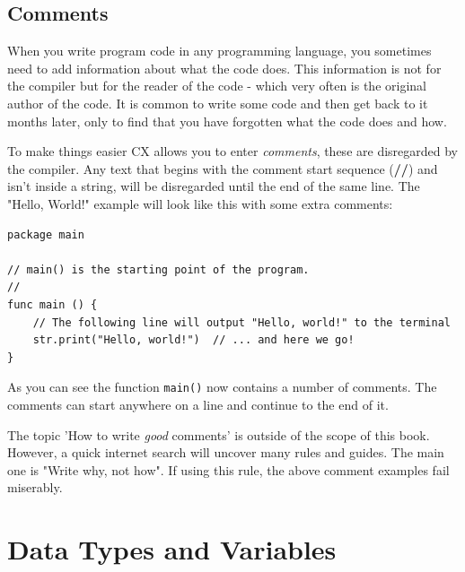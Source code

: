 \documentclass[11pt,fleqn,openany]{book} %
\begin{document}
\section{Comments}

When you write program code in any programming language, you sometimes need to add information about what the code does. This information is not for the compiler but for the reader of the code - which very often is the original author of the code. It is common to write some code and then get back to it months later, only to find that you have forgotten what the code does and how.

To make things easier CX allows you to enter \emph{comments}, these are disregarded by the compiler. Any text that begins with the comment start sequence (\textbf{//}) and isn't inside a string, will be disregarded until the end of the same line. The "Hello, World!" example will look like this with some extra comments:

\begin{lstlisting}[caption={Commented "Hello, world!" example},captionpos=b,label={listing:hello-world-commented}]
package main

// main() is the starting point of the program.
//
func main () {
    // The following line will output "Hello, world!" to the terminal
 	str.print("Hello, world!")  // ... and here we go!
}
\end{lstlisting}

As you can see the function \texttt{main()} now contains a number of comments. The comments can start anywhere on a line and continue to the end of it.

The topic 'How to write \emph{good} comments' is outside of the scope of this book. However, a quick internet search will uncover many rules and guides.  The main one is "Write why, not how". If using this rule, the above comment examples fail miserably.



\chapter{Data Types and Variables}
\label{chapter:data-types}
\end{document}
